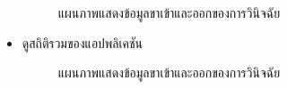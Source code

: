 \documentclass[12pt,oneside,openright,a4paper]{cpe-thai-project}
\begin{document}
\begin{itemize}
\begin{figure}[!ht]
      \caption{แผนภาพแสดงข้อมูลขาเข้าและออกของการวินิจฉัย}\label{fig:system}
     \end{figure}
     \newpage
    \item ดูสถิติรวมของแอปพลิเคชัน
    \begin{figure}[!ht]\centering
      \setlength{\fboxrule}{0.2mm} %
      \setlength{\fboxsep}{1cm}
      \caption{แผนภาพแสดงข้อมูลขาเข้าและออกของการวินิจฉัย}\label{fig:system}
     \end{figure}
  \end{itemize}
\end{document}
